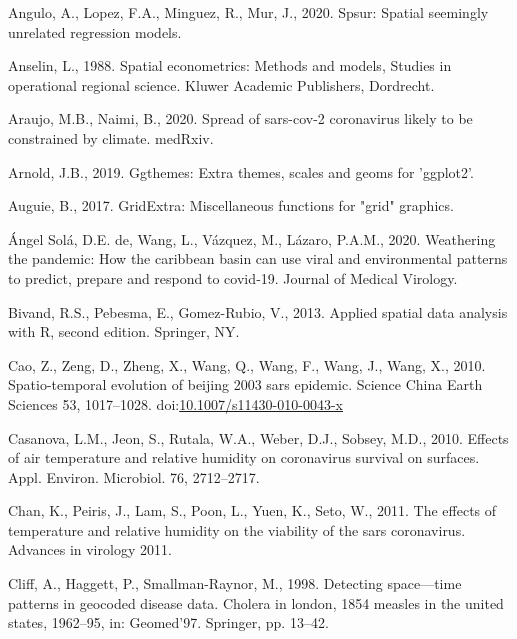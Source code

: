 \documentclass[]{elsarticle} %
\begin{document}
\leavevmode\hypertarget{ref-Angulo2020spsur}{}%
Angulo, A., Lopez, F.A., Minguez, R., Mur, J., 2020. Spsur: Spatial
seemingly unrelated regression models.

\leavevmode\hypertarget{ref-Anselin1988spatial}{}%
Anselin, L., 1988. Spatial econometrics: Methods and models, Studies in
operational regional science. Kluwer Academic Publishers, Dordrecht.

\leavevmode\hypertarget{ref-Araujo2020spread}{}%
Araujo, M.B., Naimi, B., 2020. Spread of sars-cov-2 coronavirus likely
to be constrained by climate. medRxiv.

\leavevmode\hypertarget{ref-Arnold2019}{}%
Arnold, J.B., 2019. Ggthemes: Extra themes, scales and geoms for
'ggplot2'.

\leavevmode\hypertarget{ref-Auguie2017gridextra}{}%
Auguie, B., 2017. GridExtra: Miscellaneous functions for "grid"
graphics.

\leavevmode\hypertarget{ref-deangel2020weathering}{}%
Ángel Solá, D.E. de, Wang, L., Vázquez, M., Lázaro, P.A.M., 2020.
Weathering the pandemic: How the caribbean basin can use viral and
environmental patterns to predict, prepare and respond to covid‐19.
Journal of Medical Virology.

\leavevmode\hypertarget{ref-Bivand2013}{}%
Bivand, R.S., Pebesma, E., Gomez-Rubio, V., 2013. Applied spatial data
analysis with R, second edition. Springer, NY.

\leavevmode\hypertarget{ref-Cao2010spatio}{}%
Cao, Z., Zeng, D., Zheng, X., Wang, Q., Wang, F., Wang, J., Wang, X.,
2010. Spatio-temporal evolution of beijing 2003 sars epidemic. Science
China Earth Sciences 53, 1017--1028.
doi:\href{https://doi.org/10.1007/s11430-010-0043-x}{10.1007/s11430-010-0043-x}

\leavevmode\hypertarget{ref-Casanova2010effects}{}%
Casanova, L.M., Jeon, S., Rutala, W.A., Weber, D.J., Sobsey, M.D., 2010.
Effects of air temperature and relative humidity on coronavirus survival
on surfaces. Appl. Environ. Microbiol. 76, 2712--2717.

\leavevmode\hypertarget{ref-Chan2011effects}{}%
Chan, K., Peiris, J., Lam, S., Poon, L., Yuen, K., Seto, W., 2011. The
effects of temperature and relative humidity on the viability of the
sars coronavirus. Advances in virology 2011.

\leavevmode\hypertarget{ref-Cliff1998detecting}{}%
Cliff, A., Haggett, P., Smallman-Raynor, M., 1998. Detecting
space---time patterns in geocoded disease data. Cholera in london, 1854
measles in the united states, 1962--95, in: Geomed'97. Springer, pp.
13--42.
\end{document}
